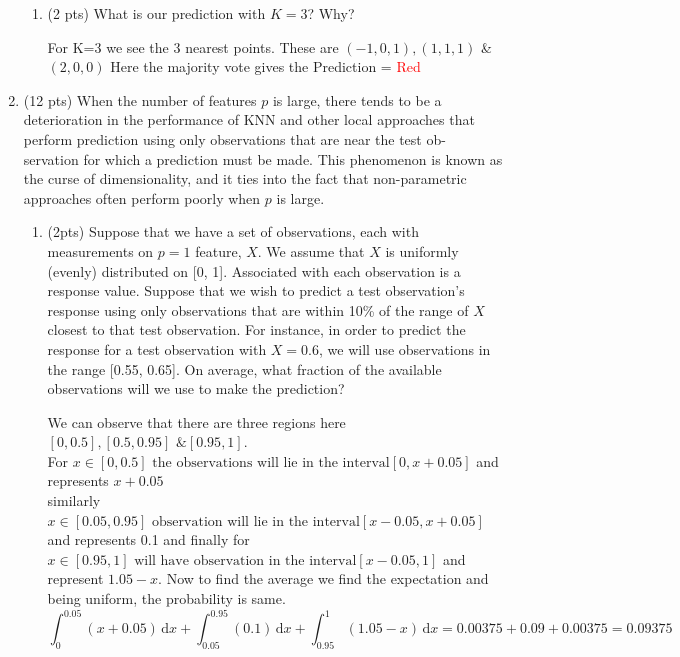 \documentclass[a4paper]{article}
\theoremstyle{definition}
\newenvironment{soln}{
    \leavevmode\color{blue}\ignorespaces
}{}
\begin{document}
\begin{enumerate}
\begin{enumerate}
	\item (2 pts) What is our prediction with $K=3$? Why?
	
	\begin{soln} For K=3 we see the 3 nearest points. These are $(-1,0,1),(1,1,1)$ \& $(2,0,0)$ Here the majority vote gives the Prediction = \textcolor{red}{Red}\end{soln}

\end{enumerate}

\item (12 pts) When the number of features $p$ is large, there tends to be a deterioration in the performance of KNN and other local approaches that perform prediction using only observations that are near the test ob- servation for which a prediction must be made. This phenomenon is known as the curse of dimensionality, and it ties into the fact that non-parametric approaches often perform poorly when $p$ is large.

\begin{enumerate}
	\item (2pts) Suppose that we have a set of observations, each with measurements on $p=1$ feature, $X$. We assume that $X$ is uniformly (evenly) distributed on [0, 1]. Associated with each observation is a response value. Suppose that we wish to predict a test observation’s response using only observations that are within 10\% of the range of $X$ closest to that test observation. For instance, in order to predict the response for a test observation with $X=0.6$, we will use observations in the range [0.55, 0.65]. On average, what fraction of the available observations will we use to make the prediction?
	
	\begin{soln}  We can observe that there are three regions here $[0,0.5],[0.5,0.95]\text{ \& }[0.95,1]$. \\
 For $x\in [0,0.5]\text{ the observations will lie in the interval} [0,x+0.05]$ and represents $x+0.05$\\
 similarly $x\in [0.05,0.95] \text{ observation will lie in the interval} [x-0.05,x+0.05] $ and represents  0.1 and finally for $x\in[0.95,1] \text{ will have observation in the interval}[x-0.05,1]$ and represent $1.05-x$. Now to find the average we find the expectation and being uniform, the probability is same.\\
 $$
 \int_0^{0.05} \! (x+0.05) \, \mathrm{d}x + \int_{0.05}^{0.95} \! (0.1) \, \mathrm{d}x + \int_{0.95}^{1} \! (1.05-x) \, \mathrm{d}x = 0.00375 + 0.09 + 0.00375=0.09375$$
 \end{soln}
	

\end{enumerate}
\end{enumerate}
\end{document}
